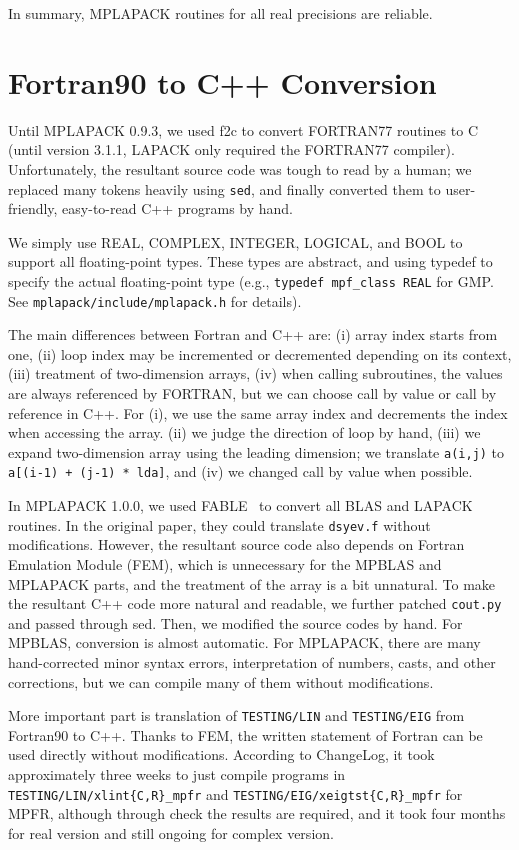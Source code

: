 \documentclass[12pt]{article}
\begin{document}
In summary, MPLAPACK routines for all real precisions are reliable. 
\section{Fortran90 to C++ Conversion}
\label{sec:howtoconvert}
Until MPLAPACK 0.9.3, we used f2c to convert FORTRAN77 routines to C (until version 3.1.1, LAPACK only required the FORTRAN77 compiler). Unfortunately, the resultant source code was tough to read by a human; we replaced many tokens heavily using {\tt sed}, and finally converted them to user-friendly, easy-to-read C++ programs by hand.

We simply use REAL, COMPLEX, INTEGER, LOGICAL, and BOOL to support all floating-point types. These types are abstract, and using typedef to specify the actual floating-point type (e.g., {\tt typedef mpf\_class REAL} for GMP. See {\tt mplapack/include/mplapack.h} for details).

The main differences between Fortran and C++ are: (i) array index starts from one, (ii) loop index may be incremented or decremented depending on its context, (iii) treatment of two-dimension arrays, (iv) when calling subroutines, the values are always referenced by FORTRAN, but we can choose call by value or call by reference in C++.  For (i), we use the same array index and decrements the index when accessing the array. (ii) we judge the direction of loop by hand, (iii) we expand two-dimension array using the leading dimension; we translate {\tt a(i,j)} to {\tt a[(i-1)  + (j-1) * lda]}, and (iv) we changed call by value when possible.

In MPLAPACK 1.0.0, we used FABLE~\cite{fable} to convert all BLAS and LAPACK routines. In the original paper, they could translate {\tt dsyev.f} without modifications. However, the resultant source code also depends on Fortran Emulation Module (FEM), which is unnecessary for the MPBLAS and MPLAPACK parts, and the treatment of the array is a bit unnatural.  To make the resultant C++ code more natural and readable, we further patched {\tt cout.py} and passed through sed. Then, we modified the source codes by hand. For MPBLAS, conversion is almost automatic. For MPLAPACK, there are many hand-corrected minor syntax errors, interpretation of numbers, casts, and other corrections, but we can compile many of them without modifications. 

More important part is translation of {\tt TESTING/LIN} and {\tt TESTING/EIG} from Fortran90 to C++. Thanks to FEM, the written statement of Fortran can be used  directly without modifications. According to ChangeLog, it took approximately three weeks to just compile programs in \\
{\tt TESTING/LIN/xlint\{C,R\}\_mpfr} and {\tt TESTING/EIG/xeigtst\{C,R\}\_mpfr} for MPFR, although through check the results are required, and it took four months for real version and still ongoing for complex version.
\end{document}
